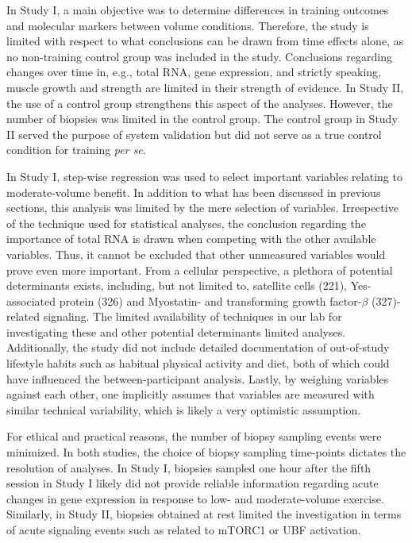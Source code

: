 \documentclass[twoside,10pt]{gihclass} %
\begin{document}
In Study I, a main objective was to determine differences in training outcomes and molecular markers between volume conditions. Therefore, the study is limited with respect to what conclusions can be drawn from time effects alone, as no non-training control group was included in the study. Conclusions regarding changes over time in, e.g., total RNA, gene expression, and strictly speaking, muscle growth and strength are limited in their strength of evidence.
In Study II, the use of a control group strengthens this aspect of the analyses. However, the number of biopsies was limited in the control group. The control group in Study II served the purpose of system validation but did not serve as a true control condition for training \emph{per se}.

In Study I, step-wise regression was used to select important variables relating to moderate-volume benefit. In addition to what has been discussed in previous sections, this analysis was limited by the mere selection of variables. Irrespective of the technique used for statistical analyses, the conclusion regarding the importance of total RNA is drawn when competing with the other available variables. Thus, it cannot be excluded that other unmeasured variables would prove even more important.
From a cellular perspective, a plethora of potential determinants exists, including, but not limited to,
satellite cells (221),
Yes-associated protein (326) and
Myostatin- and transforming growth factor-\(\beta\) (327)-related signaling. The limited availability of techniques in our lab for investigating these and other potential determinants limited analyses.
Additionally, the study did not include detailed documentation of out-of-study lifestyle habits such as habitual physical activity and diet, both of which could have influenced the between-participant analysis.
Lastly, by weighing variables against each other, one implicitly assumes that variables are measured with similar technical variability, which is likely a very optimistic assumption.

For ethical and practical reasons, the number of biopsy sampling events were minimized. In both studies, the choice of biopsy sampling time-points dictates the resolution of analyses. In Study I, biopsies sampled one hour after the fifth session in Study I likely did not provide reliable information regarding acute changes in gene expression in response to low- and moderate-volume exercise. Similarly, in Study II, biopsies obtained at rest limited the investigation in terms of acute signaling events such as related to mTORC1 or UBF activation.
\end{document}
